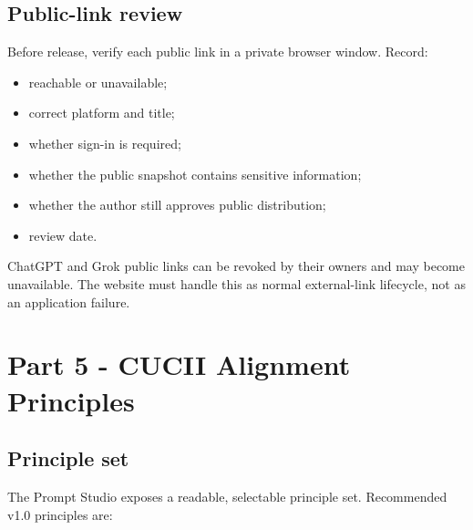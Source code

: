 \documentclass[11pt,letterpaper]{article}
\begin{document}
\subsection{Public-link review}

Before release, verify each public link in a private browser window. Record:

\begin{itemize}
    \item reachable or unavailable;
    \item correct platform and title;
    \item whether sign-in is required;
    \item whether the public snapshot contains sensitive information;
    \item whether the author still approves public distribution;
    \item review date.
\end{itemize}

ChatGPT and Grok public links can be revoked by their owners and may become
unavailable. The website must handle this as normal external-link lifecycle,
not as an application failure.

\section{Part 5 - CUCII Alignment Principles}

\subsection{Principle set}

The Prompt Studio exposes a readable, selectable principle set. Recommended
v1.0 principles are:
\end{document}
